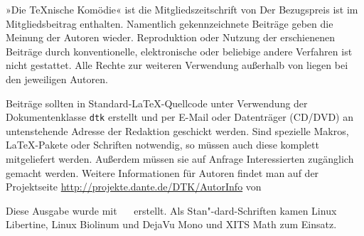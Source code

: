 \begingroup
\small

»Die \TeX{}nische Komödie« ist die Mitgliedszeitschrift von
\dante{} Der Bezugspreis ist im Mitgliedsbeitrag enthalten.
Namentlich gekennzeichnete Beiträge geben die Meinung der
Autoren wieder.  Reproduktion oder Nutzung der erschienenen
Beiträge durch konventionelle, elektronische oder beliebige andere
Verfahren ist nicht gestattet. Alle Rechte zur weiteren Verwendung
außerhalb von \dante{} liegen bei den jeweiligen Autoren.

Beiträge sollten in Standard-\LaTeX-Quellcode unter Verwendung der
Dokumentenklasse \texttt{dtk} erstellt und per \mbox{E-Mail} oder
Datenträger (CD/DVD) an untenstehende Adresse
der Redaktion geschickt werden.  Sind
spezielle Makros, \LaTeX-Pakete oder Schriften notwendig, so
müssen auch diese komplett mitgeliefert werden.  Außerdem müssen sie auf
Anfrage Interessierten zugänglich gemacht werden. Weitere Informationen
für Autoren
findet man auf der Projektseite \url{http://projekte.dante.de/DTK/AutorInfo}
von \dante

\smallskip


Diese Ausgabe wurde mit \texttt{\,\InfoTeX\,} erstellt.
Als Stan"-dard-Schriften kamen Linux Libertine, Linux Biolinum
und DejaVu Mono und XITS Math zum Einsatz.

